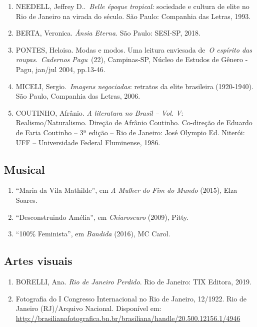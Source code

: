\documentclass[12pt]{extarticle}
\begin{document}
\begin{enumerate}
\item
  NEEDELL, Jeffrey D..~\emph{Belle époque tropical:} sociedade
  e cultura de elite no Rio de Janeiro na virada do século. São
  Paulo: Companhia das Letras, 1993.
\item
  BERTA, Veronica. \textit{Ânsia Eterna}. São Paulo: SESI-SP,
  2018.
\item
  PONTES, Heloisa. Modas e modos. Uma leitura enviesada de~\emph{O
  espírito das roupas}.~\textit{Cadernos Pagu}~(22), Campinas-SP, Núcleo
  de Estudos de Gênero - Pagu, jan/jul 2004, pp.13-46.
\item
  MICELI, Sergio.~\textit{Imagens negociadas}: retratos da elite
  brasileira (1920-1940). São Paulo, Companhia das Letras, 2006.~
\item
  COUTINHO, Afrânio. \textit{A literatura no Brasil -- Vol. V}:
  Realismo/Naturalismo. Direção de Afrânio Coutinho. Co-direção de
  Eduardo de Faria Coutinho -- 3ª edição -- Rio de Janeiro: José Olympio
  Ed. Niterói: UFF -- Universidade Federal Fluminense, 1986.
\end{enumerate}

\subsection{Musical}

\begin{enumerate}
\item
  ``Maria da Vila Mathilde'', em \emph{A Mulher do Fim do Mundo}
  (2015), Elza Soares.
\item
  ``Desconstruindo Amélia'', em \emph{Chiaroscuro} (2009), Pitty.
\item
  ``100\% Feminista'', em \emph{Bandida} (2016), MC Carol.
\end{enumerate}

\subsection{Artes visuais}

\begin{enumerate}
\item
  BORELLI, Ana. \emph{Rio de Janeiro Perdido}. Rio de Janeiro: TIX
  Editora, 2019.
\item
  Fotografia do I Congresso Internacional no Rio de Janeiro, 12/1922.
  Rio de Janeiro (RJ)/Arquivo Nacional. Disponível em:
  \url{http://brasilianafotografica.bn.br/brasiliana/handle/20.500.12156.1/4946}
\end{enumerate}
\end{document}
